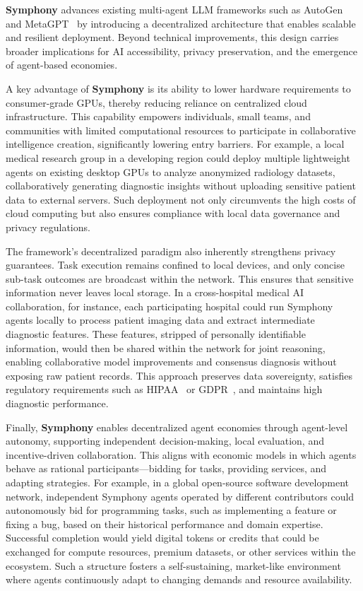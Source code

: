 \documentclass{article}
\begin{document}
\textbf{Symphony} advances existing multi-agent LLM frameworks such as AutoGen~\cite{autogen2023} and MetaGPT~\cite{metagpt2023} by introducing a decentralized architecture that enables scalable and resilient deployment. Beyond technical improvements, this design carries broader implications for AI accessibility, privacy preservation, and the emergence of agent-based economies.

A key advantage of \textbf{Symphony} is its ability to lower hardware requirements to consumer-grade GPUs, thereby reducing reliance on centralized cloud infrastructure. This capability empowers individuals, small teams, and communities with limited computational resources to participate in collaborative intelligence creation, significantly lowering entry barriers. For example, a local medical research group in a developing region could deploy multiple lightweight agents on existing desktop GPUs to analyze anonymized radiology datasets, collaboratively generating diagnostic insights without uploading sensitive patient data to external servers. Such deployment not only circumvents the high costs of cloud computing but also ensures compliance with local data governance and privacy regulations.

The framework’s decentralized paradigm also inherently strengthens privacy guarantees. Task execution remains confined to local devices, and only concise sub-task outcomes are broadcast within the network. This ensures that sensitive information never leaves local storage. In a cross-hospital medical AI collaboration, for instance, each participating hospital could run Symphony agents locally to process patient imaging data and extract intermediate diagnostic features. These features, stripped of personally identifiable information, would then be shared within the network for joint reasoning, enabling collaborative model improvements and consensus diagnosis without exposing raw patient records. This approach preserves data sovereignty, satisfies regulatory requirements such as HIPAA~\cite{hipaa1996} or GDPR~\cite{gdpr2016}, and maintains high diagnostic performance.

Finally, \textbf{Symphony} enables decentralized agent economies through agent-level autonomy, supporting independent decision-making, local evaluation, and incentive-driven collaboration. This aligns with economic models in which agents behave as rational participants—bidding for tasks, providing services, and adapting strategies. For example, in a global open-source software development network, independent Symphony agents operated by different contributors could autonomously bid for programming tasks, such as implementing a feature or fixing a bug, based on their historical performance and domain expertise. Successful completion would yield digital tokens or credits that could be exchanged for compute resources, premium datasets, or other services within the ecosystem. Such a structure fosters a self-sustaining, market-like environment where agents continuously adapt to changing demands and resource availability.
\end{document}
